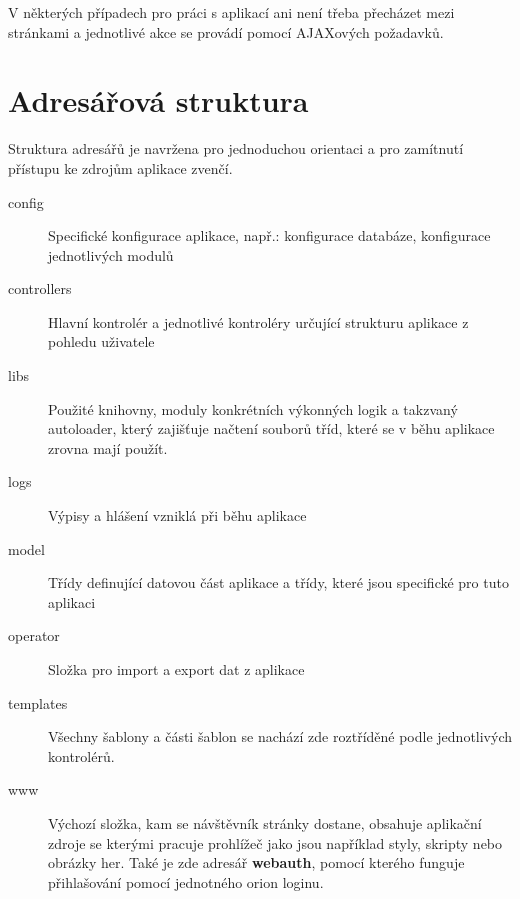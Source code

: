 \documentclass[12pt,a4paper]{article}
\let\oldsection\section
\renewcommand\section{\clearpage\oldsection}
\begin{document}
V některých případech pro práci s aplikací ani není třeba přecházet mezi stránkami a jednotlivé akce se provádí pomocí AJAXových požadavků.


{\section{Adresářová struktura}}
Struktura adresářů je navržena pro jednoduchou orientaci a pro zamítnutí přístupu ke zdrojům aplikace zvenčí.

\begin{description}
\item[config]
Specifické konfigurace aplikace, např.: konfigurace databáze, konfigurace jednotlivých modulů
\item[controllers]
Hlavní kontrolér a jednotlivé kontroléry určující strukturu aplikace z pohledu uživatele
\item[libs]
Použité knihovny, moduly konkrétních výkonných logik a takzvaný autoloader, který zajišťuje načtení souborů tříd, které se v běhu aplikace zrovna mají použít.
\item[logs]
Výpisy a hlášení vzniklá při běhu aplikace
\item[model]
Třídy definující datovou část aplikace a třídy, které jsou specifické pro tuto aplikaci
\item[operator]
Složka pro import a export dat z aplikace
\item[templates]
Všechny šablony a části šablon se nachází zde roztříděné podle jednotlivých kontrolérů.
\item[www]
Výchozí složka, kam se návštěvník stránky dostane, obsahuje aplikační zdroje se kterými pracuje prohlížeč jako jsou například styly, skripty nebo obrázky her. Také je zde adresář \textbf{webauth}, pomocí kterého funguje přihlašování pomocí jednotného orion loginu.
\end{description}
\end{document}

